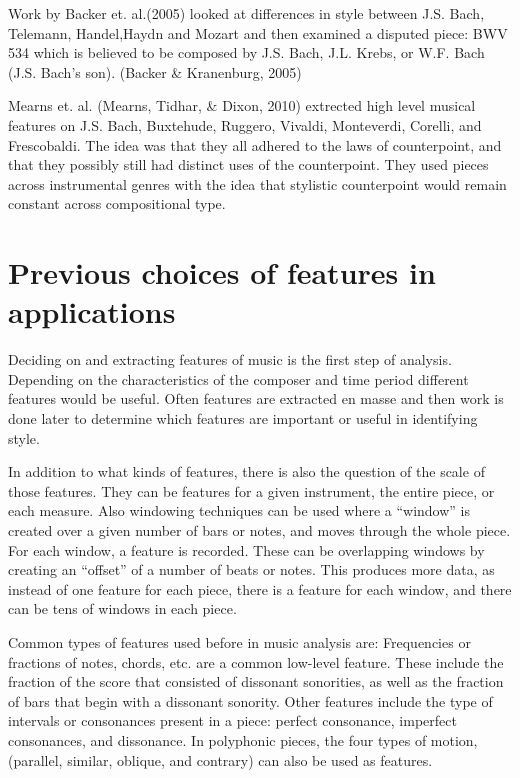 \documentclass[12pt,twoside]{reedthesis}
\theoremstyle{definition}
\theoremstyle{definition}
\theoremstyle{definition}
\theoremstyle{remark}
\begin{document}
Work by Backer et. al.(2005) looked at differences in style between J.S.
Bach, Telemann, Handel,Haydn and Mozart and then examined a disputed
piece: BWV 534 which is believed to be composed by J.S. Bach, J.L.
Krebs, or W.F. Bach (J.S. Bach's son). (Backer \& Kranenburg, 2005)

Mearns et. al. (Mearns, Tidhar, \& Dixon, 2010) extrected high level
musical features on J.S. Bach, Buxtehude, Ruggero, Vivaldi, Monteverdi,
Corelli, and Frescobaldi. The idea was that they all adhered to the laws
of counterpoint, and that they possibly still had distinct uses of the
counterpoint. They used pieces across instrumental genres with the idea
that stylistic counterpoint would remain constant across compositional
type.

\section{Previous choices of features in
applications}\label{previous-choices-of-features-in-applications}

Deciding on and extracting features of music is the first step of
analysis. Depending on the characteristics of the composer and time
period different features would be useful. Often features are extracted
en masse and then work is done later to determine which features are
important or useful in identifying style.

In addition to what kinds of features, there is also the question of the
scale of those features. They can be features for a given instrument,
the entire piece, or each measure. Also windowing techniques can be used
where a ``window'' is created over a given number of bars or notes, and
moves through the whole piece. For each window, a feature is recorded.
These can be overlapping windows by creating an ``offset'' of a number
of beats or notes. This produces more data, as instead of one feature
for each piece, there is a feature for each window, and there can be
tens of windows in each piece.

Common types of features used before in music analysis are: Frequencies
or fractions of notes, chords, etc. are a common low-level feature.
These include the fraction of the score that consisted of dissonant
sonorities, as well as the fraction of bars that begin with a dissonant
sonority. Other features include the type of intervals or consonances
present in a piece: perfect consonance, imperfect consonances, and
dissonance. In polyphonic pieces, the four types of motion, (parallel,
similar, oblique, and contrary) can also be used as features.
\end{document}
